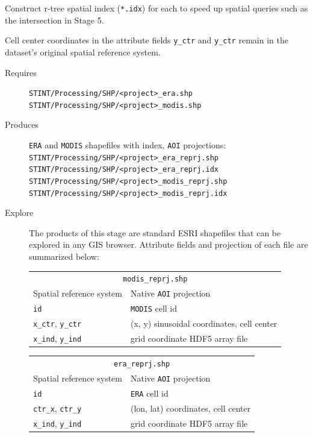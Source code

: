 \documentclass[twoside,a4paper]{refart}
\begin{document}
Construct r-tree spatial index (\texttt{*.idx}) for each to speed up spatial queries such as the intersection in Stage 5.

Cell center coordinates in the attribute fields \texttt{y\_ctr} and \texttt{y\_ctr} remain in the dataset's original spatial reference system.

  \begin{description}
    \item [Requires]
      \texttt{STINT/Processing/SHP/<project>\_era.shp}\\
      \texttt{STINT/Processing/SHP/<project>\_modis.shp}
  
    \item [Produces]
      \texttt{ERA} and \texttt{MODIS} shapefiles with index, 
      \texttt{AOI} projections:\\ 
      \texttt{STINT/Processing/SHP/<project>\_era\_reprj.shp}\\
      \texttt{STINT/Processing/SHP/<project>\_era\_reprj.idx}\\
      \texttt{STINT/Processing/SHP/<project>\_modis\_reprj.shp}\\
      \texttt{STINT/Processing/SHP/<project>\_modis\_reprj.idx}      
      

    \item [Explore]
      The products of this stage are standard ESRI shapefiles that can be explored in any GIS browser.  Attribute fields and projection of each file are summarized below:
      
\begin{tabular}{ll}
       \multicolumn{2}{c}{\texttt{modis\_reprj.shp}} \\
Spatial reference system        & Native \texttt{AOI} projection \\
\texttt{id}                     & \texttt{MODIS} cell id \\  
\texttt{x\_ctr}, \texttt{y\_ctr} & (x, y) sinusoidal coordinates, cell center \\
\texttt{x\_ind}, \texttt{y\_ind} & grid coordinate HDF5 array file\\
\end{tabular}
      
\begin{tabular}{ll}
       \multicolumn{2}{c}{ \texttt{era\_reprj.shp}} \\
Spatial reference system        & Native \texttt{AOI} projection \\
\texttt{id}                     & \texttt{ERA} cell id\\
\texttt{ctr\_x}, \texttt{ctr\_y} & (lon, lat) coordinates, cell center \\ 
\texttt{x\_ind}, \texttt{y\_ind} & grid coordinate HDF5 array file\\
\end{tabular}

  \end{description}
\end{document}
